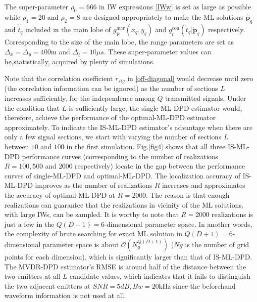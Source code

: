 \documentclass[review]{elsarticle}
\begin{document}
The super-parameter $\rho_0=666$ in IW expressions \eqref{IWw} is set as large as possible while $\rho_1=20$ and $\rho_2=8$ are designed appropriately to make the ML solutions $\hat{\boldsymbol{p}}_q$ and $\hat{\mathring{t}}_q$ included in the main lobe of $g_{\boldsymbol{p}}^{\text{mar}}(x_q,y_q)$ and $g_{\mathring{t}}^{\text{con}}(\mathring{t}_q\vert \mathring{\boldsymbol{p}}_q)$ respectively. Corresponding to the size of the main lobe, the range parameters are set as $\Delta_x=\Delta_y=400$m and $\Delta_{\mathring{t}}=10\mu s$. These super-parameter values can be,statistically, acquired by plenty of simulations.

Note that the correlation coefficient $r_{sig}$ in \eqref{off-diagonal} would decrease until zero (the correlation information can be ignored) as the number of sections $L$ increases sufficiently, for the independence among $Q$ transmitted signals. Under the condition that $L$ is sufficiently large, the single-ML-DPD estimator would, therefore, achieve the performance of the optimal-ML-DPD estimator approximately. To indicate the IS-ML-DPD estimator's advantage when there are only a few signal sections, we start with varying the number of sections $L$ between $10$ and $100$ in the first simulation. Fig.\ref{fig4} shows that all three IS-ML-DPD performance curves (corresponding to the number of realizations $R=100,500$ and $2000$ respectively) locate in the gap between the performance curves of single-ML-DPD and optimal-ML-DPD. The localization accuracy of IS-ML-DPD improves as the number of realizations $R$ increases and approximates the accuracy of optimal-ML-DPD at $R=2000$. The reason is that enough realizations can guarantee that the realizations in vicinity of the ML solutions, with large IWs, can be sampled. It is worthy to note that $R=2000$ realizations is just a few in the $Q(D+1)=6$-dimensional parameter space. In another words, the complexity of brute searching for exact ML solution in $Q(D+1)=6$-dimensional parameter space is about $\mathcal{O}(N_g^{Q(D+1)})$ ($Ng$ is the number of grid points for each dimension), which is significantly larger than that of IS-ML-DPD. The MVDR-DPD estimator's RMSE is around half of the distance between the two emitters at all $L$ candidate values, which indicates that it fails to distinguish the two adjacent emitters at $SNR=5dB,Bw=20$kHz since the beforehand waveform information is not used at all.
\end{document}
